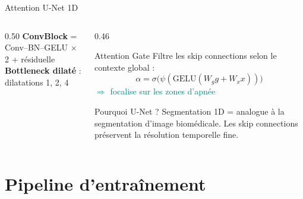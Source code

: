 \documentclass[aspectratio=169, 10pt]{beamer}
\begin{document}
\begin{frame}{Attention U-Net 1D}
\begin{columns}[T]
\begin{column}{0.50\textwidth}
            \vspace{0.2cm}
            \small\textbf{ConvBlock} = Conv--BN--GELU $\times$ 2 + résiduelle\\
            \textbf{Bottleneck dilaté} : dilatations 1, 2, 4
        \end{column}
        \begin{column}{0.46\textwidth}
            \begin{block}{\small Attention Gate}
                \small Filtre les skip connections selon le contexte global :
                \[
                    \alpha = \sigma\!\bigl(\psi(\text{GELU}(W_g g + W_x x))\bigr)
                \]
                \textcolor{Teal}{$\Rightarrow$ focalise sur les zones d'apnée}
            \end{block}
            \vspace{0.15cm}
            \begin{block}{\small Pourquoi U-Net ?}
                \small Segmentation 1D = analogue à la segmentation d'image biomédicale.
                Les skip connections préservent la résolution temporelle fine.
            \end{block}
        \end{column}
    \end{columns}
\end{frame}

\section{Pipeline d'entraînement}
\end{document}
